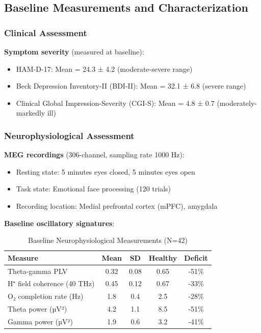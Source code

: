 \subsection{Baseline Measurements and Characterization}

\subsubsection{Clinical Assessment}

\textbf{Symptom severity} (measured at baseline):
\begin{itemize}
\item HAM-D-17: Mean = 24.3 ± 4.2 (moderate-severe range)
\item Beck Depression Inventory-II (BDI-II): Mean = 32.1 ± 6.8 (severe range)
\item Clinical Global Impression-Severity (CGI-S): Mean = 4.8 ± 0.7 (moderately-markedly ill)
\end{itemize}

\subsubsection{Neurophysiological Assessment}

\textbf{MEG recordings} (306-channel, sampling rate 1000 Hz):
\begin{itemize}
\item Resting state: 5 minutes eyes closed, 5 minutes eyes open
\item Task state: Emotional face processing (120 trials)
\item Recording location: Medial prefrontal cortex (mPFC), amygdala
\end{itemize}

\textbf{Baseline oscillatory signatures}:

\begin{table}[H]
\centering
\caption{Baseline Neurophysiological Measurements (N=42)}
\begin{tabular}{lcccc}
\toprule
\textbf{Measure} & \textbf{Mean} & \textbf{SD} & \textbf{Healthy} & \textbf{Deficit} \\
\midrule
Theta-gamma PLV & 0.32 & 0.08 & 0.65 & -51\% \\
H⁺ field coherence (40 THz) & 0.45 & 0.12 & 0.67 & -33\% \\
O₂ completion rate (Hz) & 1.8 & 0.4 & 2.5 & -28\% \\
Theta power (µV²) & 4.2 & 1.1 & 8.5 & -51\% \\
Gamma power (µV²) & 1.9 & 0.6 & 3.2 & -41\% \\
\bottomrule
\end{tabular}
\end{table}

